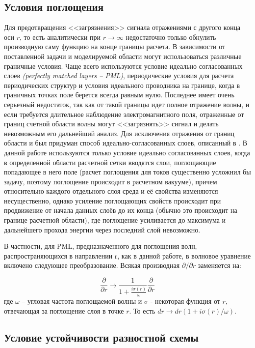 \documentclass[a4paper]{article}
\begin{document}
\subsection{Условия поглощения}

Для предотвращения <<загрязнения>> сигнала отражениями с другого конца оси $r$, то есть аналитически при $r\rightarrow\infty$ недостаточно только обнулить производную саму функцию на конце границы расчета. В зависимости от поставленной задачи и моделируемой области могут использоваться различные граничные условия. Чаще всего используются условие идеально согласованных слоев \textit{(perfectly matched layers -- PML)}, периодические условия для расчета периодических структур и условия идеального проводника на границе, когда в граничных
точках поле берется всегда равным нулю. Последнее имеет очень серьезный недостаток, так как от такой границы идет полное отражение волны, и если требуется длительное
наблюдение электромагнитного поля, отраженные от границ счетной области волны могут <<загрязнять>> сигнал и делать невозможным его дальнейший анализ. Для исключения отражения от границ области и был придуман способ идеально-согласованных слоев, описанный в \cite{fdtd_pml}. В данной работе используются только условие идеально согласованных слоев, когда в определенной области расчетной сетки вводятся слои, поглощающие попадающее в него поле (расчет поглощения для токов существенно усложнил бы задачу, поэтому поглощение происходит в расчетном вакууме), причем относительно каждого отдельного слоя среда и её свойства изменяются несущественно, однако усиление поглощающих свойств происходит при продвижение от начала данных слоёв до их конца (обычно это происходит на границе расчетной области), где поглощение усиливается до максимума и дальнейшего прохода энергии через последний слой невозможно.

В частности, для PML, предназначенного для поглощения волн, распространяющихся в направлении r, как в данной работе, в волновое уравнение включено следующее преобразование. Всякая производная  $\partial/\partial r$ заменяется на:

\begin{equation}
	\frac{\partial}{\partial r} \to \frac{1}{1 + \frac{i\sigma(r)}{\omega}} \frac{\partial}{\partial r}
\end{equation}
где $ \omega$ -- угловая частота поглощаемой волны и $\sigma$ - некоторая функция от $r$, отвечающая за поглощение слоя в точке $r$.  То есть $dr \to dr (1 + i\sigma(r)/\omega)$.

\subsection{Условие устойчивости разностной схемы}
\end{document}
